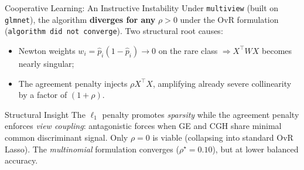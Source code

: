 \documentclass[aspectratio=169, 10pt]{beamer}
\begin{document}
\begin{frame}{Cooperative Learning: An Instructive Instability}
  Under \texttt{multiview} (built on \texttt{glmnet}), the algorithm \textbf{diverges for any} $\rho > 0$ under the OvR formulation (\texttt{algorithm did not converge}). Two structural root causes:
  \begin{itemize}
    \item Newton weights $w_i = \hat{p}_i(1 - \hat{p}_i) \to 0$ on the rare class $\Rightarrow X^\top W X$ becomes nearly singular;
    \item The agreement penalty injects $\rho X^\top X$, amplifying already severe collinearity by a factor of $(1 + \rho)$.
  \end{itemize}

  \bigskip
  \begin{block}{Structural Insight}
    The $\ell_1$ penalty promotes \textit{sparsity} while the agreement penalty enforces \textit{view coupling}: antagonistic forces when GE and CGH share minimal common discriminant signal. Only $\rho = 0$ is viable (collapsing into standard OvR Lasso). The \textit{multinomial} formulation converges ($\rho^\star = 0.10$), but at lower balanced accuracy.
  \end{block}
\end{frame}
\end{document}
